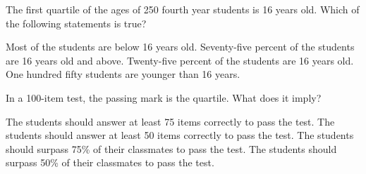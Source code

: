 \begin{questions}
\question The  first  quartile  of  the  ages  of  250  fourth  year  students  is  16  years  old. Which  of  the  following  statements  is true? 
\begin{choices} 
\choice Most  of  the  students  are  below  16  years old.
\CorrectChoice Seventy-five  percent  of  the  students  are  16  years old  and  above.
\choice Twenty-five  percent  of  the  students  are 16  years old. 
\choice One  hundred  fifty  students  are younger than  16  years. 
\end{choices}

\question In  a  100-item  test,  the  passing  mark  is  the    quartile.  What  does  it imply? 
\begin{choices} 
\choice The  students  should  answer  at  least  75  items  correctly  to  pass  the test. 
\choice The  students  should  answer  at  least  50  items  correctly  to  pass  the test.
\CorrectChoice The  students  should  surpass  75\%  of  their classmates  to  pass  the test.
\choice The  students  should  surpass  50\%  of  their classmates  to  pass  the test. 
\end{choices}




\end{questions}
